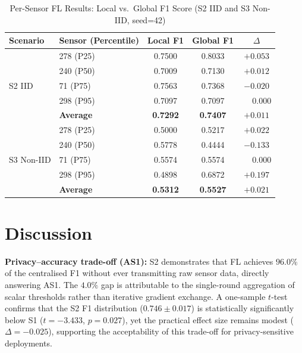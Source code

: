 \documentclass[conference]{IEEEtran}
\begin{document}
\begin{table}[t]
\caption{Per-Sensor FL Results: Local vs.\ Global F1 Score
         (S2 IID and S3 Non-IID, seed=42)}
\label{tab:persensor}
\centering
\begin{tabular}{llccc}
\toprule
\textbf{Scenario} & \textbf{Sensor (Percentile)} &
  \textbf{Local F1} & \textbf{Global F1} & \textbf{$\Delta$} \\
\midrule
\multirow{5}{*}{S2 IID}
  & 278 (P25) & 0.7500 & 0.8033 & $+0.053$ \\
  & 240 (P50) & 0.7009 & 0.7130 & $+0.012$ \\
  & 71  (P75) & 0.7563 & 0.7368 & $-0.020$ \\
  & 298 (P95) & 0.7097 & 0.7097 & $\phantom{+}0.000$ \\
  & \textbf{Average} & \textbf{0.7292} & \textbf{0.7407} & $+0.011$ \\
\midrule
\multirow{5}{*}{S3 Non-IID}
  & 278 (P25) & 0.5000 & 0.5217 & $+0.022$ \\
  & 240 (P50) & 0.5778 & 0.4444 & $-0.133$ \\
  & 71  (P75) & 0.5574 & 0.5574 & $\phantom{+}0.000$ \\
  & 298 (P95) & 0.4898 & 0.6872 & $+0.197$ \\
  & \textbf{Average} & \textbf{0.5312} & \textbf{0.5527} & $+0.021$ \\
\bottomrule
\end{tabular}
\end{table}

\section{Discussion}

\textbf{Privacy--accuracy trade-off (AS1):}
S2 demonstrates that FL achieves $96.0\%$ of the centralised F1
without ever transmitting raw sensor data, directly answering AS1.
The $4.0\%$ gap is attributable to the single-round aggregation of
scalar thresholds rather than iterative gradient exchange.
A one-sample $t$-test confirms that the S2 F1 distribution
($0.746 \pm 0.017$) is statistically significantly below S1
($t=-3.433$, $p=0.027$), yet the practical effect size remains modest
($\Delta=-0.025$), supporting the acceptability of this trade-off for
privacy-sensitive deployments.
\end{document}
